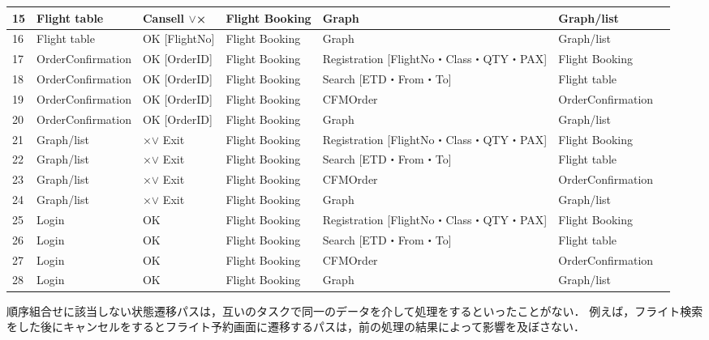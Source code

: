 \begin{table}[t]
\begin{tabular}{p{1 em}|p{5 em}|p{9.5 em}|p{5 em}|p{9.5 em}|p{5 em}|p{2 em}}
\hline
    15    & Flight table & Cansell $\lor$× & Flight Booking  & Graph & Graph/list &  \\
\hline
    16    & Flight table & OK [FlightNo] & Flight Booking  & Graph & Graph/list &  \\
\hline
    17    & OrderConfirmation & OK [OrderID] & Flight Booking  & Registration [FlightNo・Class・QTY・PAX] & Flight Booking  &  \\
\hline
    18    & OrderConfirmation & OK [OrderID] & Flight Booking  & Search [ETD・From・To] & Flight table &  \\
\hline
    19    & OrderConfirmation & OK [OrderID] & Flight Booking  & CFMOrder & OrderConfirmation &  \\
\hline
    20    & OrderConfirmation & OK [OrderID] & Flight Booking  & Graph & Graph/list &  \\
\hline
    21    & Graph/list & ×$\lor$ Exit & Flight Booking  & Registration [FlightNo・Class・QTY・PAX] & Flight Booking  &  \\
\hline
    22    & Graph/list & ×$\lor$ Exit & Flight Booking  & Search [ETD・From・To] & Flight table &  \\
\hline
    23    & Graph/list & ×$\lor$ Exit & Flight Booking  & CFMOrder & OrderConfirmation &  \\
\hline
    24    & Graph/list & ×$\lor$ Exit & Flight Booking  & Graph & Graph/list &  \\
\hline
    25    & Login & OK    & Flight Booking  & Registration [FlightNo・Class・QTY・PAX] & Flight Booking  &  \\
\hline
    26    & Login & OK    & Flight Booking  & Search [ETD・From・To] & Flight table &  \\
\hline
    27    & Login & OK    & Flight Booking  & CFMOrder & OrderConfirmation &  \\
\hline
    28    & Login & OK    & Flight Booking  & Graph & Graph/list &  \\
\hline

    \end{tabular}%
  \label{tab:STDS1}%
\end{table}%







順序組合せに該当しない状態遷移パスは，互いのタスクで同一のデータを介して処理をするといったことがない．
例えば，フライト検索をした後にキャンセルをするとフライト予約画面に遷移するパスは，前の処理の結果によって影響を及ぼさない．

